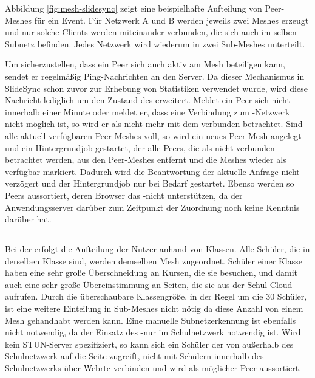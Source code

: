Abbildung \ref{fig:mesh-slidesync} zeigt eine beispielhafte Aufteilung von Peer-Meshes für ein Event. Für Netzwerk A und B werden jeweils zwei Meshes erzeugt und nur solche Clients werden miteinander verbunden, die sich auch im selben Subnetz befinden. Jedes Netzwerk wird wiederum in zwei Sub-Meshes unterteilt.

Um sicherzustellen, dass ein Peer sich auch aktiv am Mesh beteiligen kann, sendet er regelmäßig Ping-Nachrichten an den Server. Da dieser Mechanismus in SlideSync schon zuvor zur Erhebung von Statistiken verwendet wurde, wird diese Nachricht lediglich um den Zustand des \cdns erweitert. Meldet ein Peer sich nicht innerhalb einer Minute oder meldet er, dass eine Verbindung zum \pTp-Netzwerk nicht möglich ist, so wird er als nicht mehr mit dem \pTp \cdn verbunden betrachtet. Sind alle aktuell verfügbaren Peer-Meshes voll, so wird ein neues Peer-Mesh angelegt und ein Hintergrundjob gestartet, der alle Peers, die als nicht verbunden betrachtet werden, aus den Peer-Meshes entfernt und die Meshes wieder als verfügbar markiert. Dadurch wird die Beantwortung der aktuelle Anfrage nicht verzögert und der Hintergrundjob nur bei Bedarf gestartet. Ebenso werden so Peers aussortiert, deren Browser das \pTp-\cdn nicht unterstützen, da der Anwendungsserver darüber zum Zeitpunkt der Zuordnung noch keine Kenntnis darüber hat.

\subsection{\schulCloud}
Bei der \schulCloud erfolgt die Aufteilung der Nutzer anhand von Klassen. Alle Schüler, die in derselben Klasse sind, werden demselben Mesh zugeordnet. Schüler einer Klasse haben eine sehr große Überschneidung an Kursen, die sie besuchen, und damit auch eine sehr große Übereinstimmung an Seiten, die sie aus der Schul-Cloud aufrufen. Durch die überschaubare Klassengröße, in der Regel um die 30 Schüler, ist eine weitere Einteilung in Sub-Meshes nicht nötig da diese Anzahl von einem Mesh gehandhabt werden kann. Eine manuelle Subnetzerkennung ist ebenfalls nicht notwendig, da der Einsatz des \pTp-\cdns nur im Schulnetzwerk notwendig ist. Wird kein STUN-Server spezifiziert, so kann sich ein Schüler der von außerhalb des Schulnetzwerk auf die Seite zugreift, nicht mit Schülern innerhalb des Schulnetzwerks über Webrtc verbinden und wird als möglicher Peer aussortiert.


